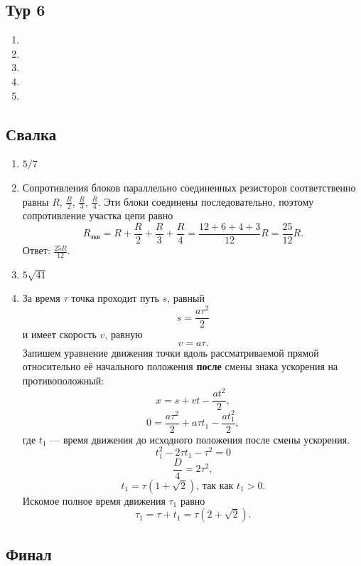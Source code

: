 \documentclass[12pt]{article} %
\begin{document}
\subsection*{Тур 6}

\begin{enumerate}
\item 
\item 
\item 
\item 
\item 
\end{enumerate}


\subsection*{Свалка}

\begin{enumerate}
\item $5/7$
\item Сопротивления блоков параллельно соединенных резисторов соответственно равны $R$, $\frac{R}{2}$, $\frac{R}{3}$, $\frac{R}{4}$. Эти блоки соединены последовательно, поэтому сопротивление участка цепи равно
\[
    R_{\text{экв}} = R + \frac{R}{2} + \frac{R}{3} + \frac{R}{4} = \frac{12+6+4+3}{12}R = \frac{25}{12}R.
\]
Ответ: $\frac{25R}{12}$.
\item $5\sqrt{41}$ 
\item         За время $\tau$ точка проходит путь $s$, равный
\[
    s = \frac{a\tau ^2}{2}
\]
и имеет скорость $v$, равную
\[
    v = a \tau.
\]
Запишем уравнение движения точки вдоль рассматриваемой прямой относительно её начального положения \textbf{после} смены знака ускорения на противоположный:
\[
    x = s + vt - \frac{at^2}{2},
\]
\[
    0 = \frac{a\tau ^2}{2} + a \tau t_1 - \frac{at_1^2}{2},
\]
где $t_1$ — время движения до исходного положения после смены ускорения.
\[
    t_1^2 - 2\tau t_1 - \tau ^2 = 0
\]
\[
    \frac{D}{4} =2 \tau ^2,
\]
\[
    t_1 = \tau (1 + \sqrt{2})\text{, так как $t_1 > 0$}.
\]
Искомое полное время движения $\tau _1$ равно 
\[
    \tau _1 = \tau + t_1 = \tau (2 + \sqrt{2}).
\]
\end{enumerate}
    
\subsection*{Финал}
\end{document}
